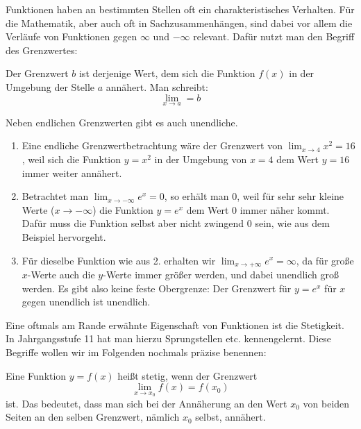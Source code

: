 \documentclass[ngerman, 12pt]{nssheetxea}
\begin{document}
Funktionen haben an bestimmten Stellen oft ein charakteristisches Verhalten. Für die Mathematik, aber auch oft in Sachzusammenhängen, sind dabei vor allem die Verläufe von Funktionen gegen $\infty$ und $-\infty$ relevant. Dafür nutzt man den Begriff des Grenzwertes:

\begin{definition}
Der Grenzwert $b$ ist derjenige Wert, dem sich die Funktion $f(x)$ in der Umgebung der Stelle $a$ annähert. Man schreibt:
\[ \lim_{x\rightarrow a} = b\]
 
\end{definition}

\begin{example}
Neben endlichen Grenzwerten gibt es auch unendliche. 
\begin{enumerate}
\item Eine endliche Grenzwertbetrachtung wäre der Grenzwert von $\lim_{x\to 4}x^2 = 16$, weil sich die Funktion $y=x^2$ in der Umgebung von $x=4$ dem Wert $y=16$ immer weiter annähert.
\item Betrachtet man $\lim_{x\to -\infty}e^x = 0$, so erhält man $0$, weil für sehr sehr kleine Werte ($x\to - \infty$) die Funktion $y=e^x$ dem Wert $0$ immer näher kommt. Dafür muss die Funktion selbst aber nicht zwingend $0$ sein, wie aus dem Beispiel hervorgeht.
\item Für dieselbe Funktion wie aus 2. erhalten wir $\lim_{x\to +\infty}e^x = \infty$, da für große $x$-Werte auch die $y$-Werte immer größer werden, und dabei unendlich groß werden. Es gibt also keine feste Obergrenze: Der Grenzwert für $y=e^x$ für $x$ gegen unendlich ist unendlich.
\end{enumerate}
\end{example}

Eine oftmals am Rande erwähnte Eigenschaft von Funktionen ist die Stetigkeit. In Jahrgangsstufe 11 hat man hierzu Sprungstellen etc. kennengelernt. Diese Begriffe wollen wir im Folgenden nochmals präzise benennen:

\begin{definition}
 
Eine Funktion $y=f(x)$ heißt stetig, wenn der Grenzwert 
\[ \lim_{x \rightarrow x_0} f(x) = f(x_0)\]
ist. Das bedeutet, dass man sich bei der Annäherung an den Wert $x_0$ von beiden Seiten an den selben Grenzwert, nämlich $x_0$ selbst, annähert.
\end{definition}
\end{document}
